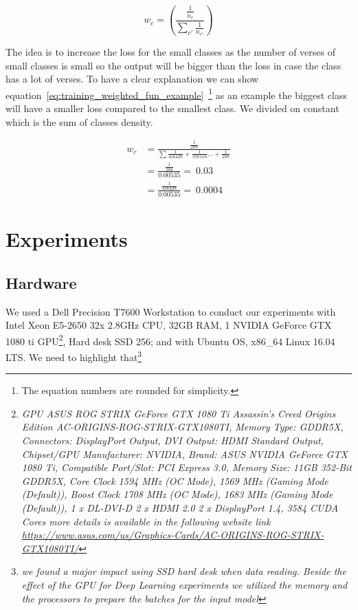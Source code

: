\begin{equation}\label{eq:training_weighted_fun}
  w_c = \left(\frac{\frac{1}{n_c}}{\sum_{c'} \frac{1}{n_{c'}}} \right)
\end{equation}

The idea is to increase the loss for the small classes as the number of verses of small classes is small so the output will be bigger than the loss in case the class has a lot of verses. To have a clear explanation we can show equation~\ref{eq:training_weighted_fun_example}~\footnote{The equation numbers are rounded for simplicity.} as an example the biggest class will have a smaller loss compared to the smallest class. We divided on constant which is the sum of classes density. 

\begin{subequations}
  \begin{align}
    w_c &=  \frac{\frac{1}{288}}{\sum\frac{1}{416428}+\frac{1}{370116}\dots+\frac{1}{288}}\\
       &= \frac{\frac{1}{288}}{0.00535} = ~0.03 \\
       &= \frac{\frac{1}{416428}}{0.00535} = ~0.0004
  \end{align}\label{eq:training_weighted_fun_example}
\end{subequations}

\clearpage

\section{Experiments}

\subsection{Hardware}

We used a Dell Precision T7600 Workstation to conduct our experiments with Intel Xeon E5-2650 32x 2.8GHz CPU, 32GB RAM, 1 NVIDIA GeForce GTX 1080 ti GPU\footnote{\textit{GPU ASUS ROG STRIX GeForce GTX 1080 Ti Assassin's Creed Origins Edition AC-ORIGINS-ROG-STRIX-GTX1080TI, Memory Type: GDDR5X, Connectors: DisplayPort Output, DVI Output: HDMI Standard Output, Chipset/GPU Manufacturer: NVIDIA, Brand: ASUS NVIDIA GeForce GTX 1080 Ti, Compatible Port/Slot: PCI Express 3.0, Memory Size: 11GB 352-Bit GDDR5X, Core Clock 1594 MHz (OC Mode), 1569 MHz (Gaming Mode (Default)), Boost Clock 1708 MHz (OC Mode), 1683 MHz (Gaming Mode (Default)), 1 x DL-DVI-D 2 x HDMI 2.0 2 x DisplayPort 1.4, 3584 CUDA Cores more details is available in the following website link \url{https://www.asus.com/us/Graphics-Cards/AC-ORIGINS-ROG-STRIX-GTX1080TI/}} }, Hard desk SSD 256; and with Ubuntu OS, x86\_64 Linux 16.04 LTS. We need to highlight that\footnote{\textit{we found a major impact using SSD hard desk when data reading. Beside the effect of the GPU for Deep Learning experiments we utilized the memory and the processors to prepare the batches for the input model}}


